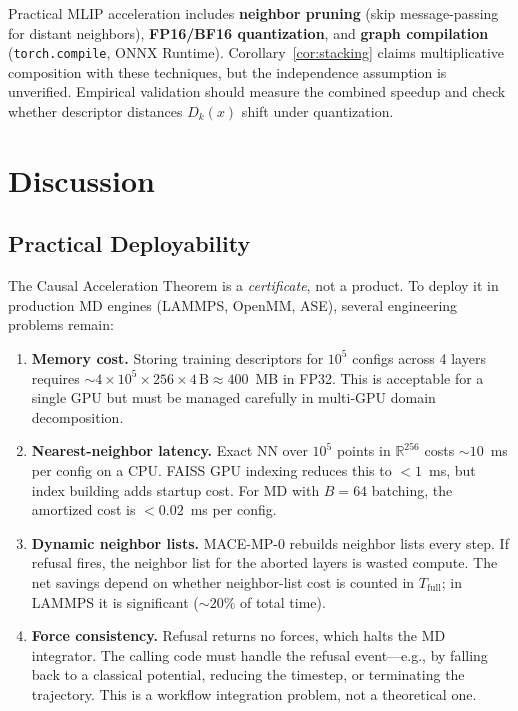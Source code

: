 \documentclass[11pt,a4paper]{article}
\begin{document}
Practical MLIP acceleration includes \textbf{neighbor pruning}\cite{fastchgnet2024} (skip message-passing for distant neighbors), \textbf{FP16/BF16 quantization}\cite{kovacs2024mace}, and \textbf{graph compilation}\cite{torchcompile2022} (\texttt{torch.compile}, ONNX Runtime). Corollary~\ref{cor:stacking} claims multiplicative composition with these techniques, but the independence assumption is unverified. Empirical validation should measure the combined speedup and check whether descriptor distances $D_k(x)$ shift under quantization.

\section{Discussion}\label{sec:discussion}

\subsection{Practical Deployability}

The Causal Acceleration Theorem is a \emph{certificate}, not a product. To deploy it in production MD engines (LAMMPS, OpenMM, ASE), several engineering problems remain:

\begin{enumerate}
    \item \textbf{Memory cost.} Storing training descriptors for $10^5$ configs across 4 layers requires $\sim 4\times 10^5 \times 256 \times 4\,\text{B} \approx 400$~MB in FP32. This is acceptable for a single GPU but must be managed carefully in multi-GPU domain decomposition.
    \item \textbf{Nearest-neighbor latency.} Exact NN over $10^5$ points in $\mathbb{R}^{256}$ costs $\sim 10$~ms per config on a CPU. FAISS GPU indexing reduces this to $<1$~ms, but index building adds startup cost. For MD with $B=64$ batching, the amortized cost is $<0.02$~ms per config.
    \item \textbf{Dynamic neighbor lists.} MACE-MP-0 rebuilds neighbor lists every step. If refusal fires, the neighbor list for the aborted layers is wasted compute. The net savings depend on whether neighbor-list cost is counted in $T_{\text{full}}$; in LAMMPS it is significant ($\sim 20\%$ of total time).
    \item \textbf{Force consistency.} Refusal returns no forces, which halts the MD integrator. The calling code must handle the refusal event---e.g., by falling back to a classical potential, reducing the timestep, or terminating the trajectory. This is a workflow integration problem, not a theoretical one.
\end{enumerate}
\end{document}
